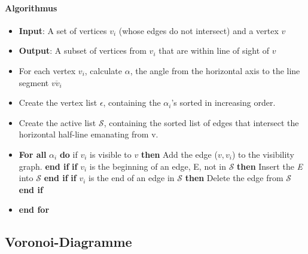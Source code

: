 \paragraph{Algorithmus}
\begin{itemize}
	\item \textbf{Input}: A  set of vertices ${v_i}$ (whose edges do not intersect) and a vertex $v$
	\item \textbf{Output}: A subset of vertices from ${v_i}$ that are within line of sight of $v$
\end{itemize}

\begin{itemize}
	\item For each vertex $v_i$, calculate $\alpha$, the angle from the horizontal axis to the line segment $\overline{vv_i}$
	\item Create the vertex list $\epsilon$, containing the $\alpha_i$'s sorted in increasing order.
	\item Create the active list $\mathcal{S}$, containing the sorted list of edges that intersect the horizontal half-line emanating from v.
	\item \textbf{For all} $\alpha_i$ \textbf{do}
	\subitem if $v_i$ is visible to $v$ \textbf{then}
	\subsubitem Add the edge ($v, v_i$) to the visibility graph.
	\subitem \textbf{end if}
	\subitem \textbf{if} $v_i$ is the beginning of an edge, E, not in $\mathcal{S}$ \textbf{then}
	\subsubitem Insert the \textit{E} into $\mathcal{S}$
	\subitem \textbf{end if}
	\subitem \textbf{if} $v_i$ is the end of an edge in $\mathcal{S}$ \textbf{then}
	\subsubitem Delete the edge from $\mathcal{S}$
	\subitem \textbf{end if}
	\item \textbf{end for}
\end{itemize}
\subsection{Voronoi-Diagramme}
